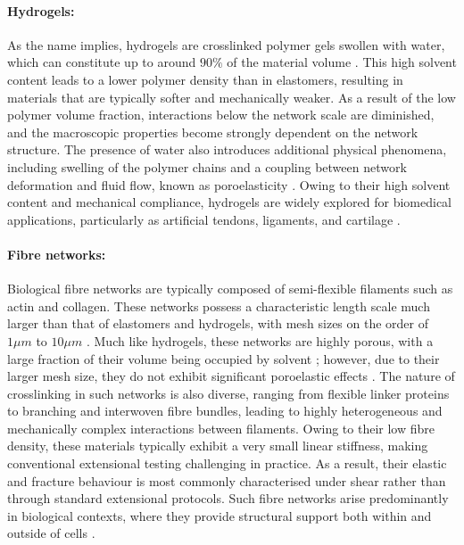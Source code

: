 \paragraph{Hydrogels:}
As the name implies, hydrogels are crosslinked polymer gels swollen with water, which can constitute up to around $90\%$ of the material volume \cite{gong_why_2010,tanaka_determination_2005,sun_highly_2012}. This high solvent content leads to a lower polymer density than in elastomers, resulting in materials that are typically softer and mechanically weaker. As a result of the low polymer volume fraction, interactions below the network scale are diminished, and the macroscopic properties become strongly dependent on the network structure. The presence of water also introduces additional physical phenomena, including swelling of the polymer chains and a coupling between network deformation and fluid flow, known as poroelasticity \cite{biotTheoryFiniteDeformations1972}. Owing to their high solvent content and mechanical compliance, hydrogels are widely explored for biomedical applications, particularly as artificial tendons, ligaments, and cartilage \cite{yasudaNovelDoubleNetworkHydrogel2009,yinSelfHealingHydrogelsSynthesis2023,hoHydrogelsPropertiesApplications2022}.

\paragraph{Fibre networks:}
Biological fibre networks are typically composed of semi-flexible filaments such as actin and collagen. These networks possess a characteristic length scale much larger than that of elastomers and hydrogels, with mesh sizes on the order of $1 \mu m$ to $10 \mu m$ \cite{mackintosh_elasticity_1995,Arevalo_Stress_Heterogeneities_2015}.
Much like hydrogels, these networks are highly porous, with a large fraction of their volume being occupied by solvent \cite{Jansen_Role_Collagen_2018}; however, due to their larger mesh size, they do not exhibit significant poroelastic effects \cite{Arevalo_Stress_Heterogeneities_2015}. The nature of crosslinking in such networks is also diverse, ranging from flexible linker proteins to branching and interwoven fibre bundles, leading to highly heterogeneous and mechanically complex interactions between filaments. Owing to their low fibre density, these materials typically exhibit a very small linear stiffness, making conventional extensional testing challenging in practice. As a result, their elastic and fracture behaviour is most commonly characterised under shear rather than through standard extensional protocols. Such fibre networks arise predominantly in biological contexts, where they provide structural support both within and outside of cells \cite{burlaMechanicalResilienceActive2019}.

